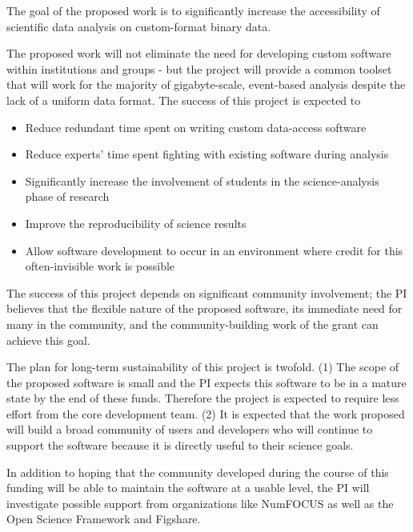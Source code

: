 The goal of the proposed work is to significantly increase the accessibility of scientific data analysis on custom-format binary data.

The proposed work will not eliminate the need for developing custom software within institutions and groups - but the project will provide a common toolset that will work for the majority of gigabyte-scale, event-based analysis despite the lack of a uniform data format.  The success of this project is expected to

\begin{itemize}
    \item Reduce redundant time spent on writing custom data-access software
    \item Reduce experts' time spent fighting with existing software during analysis
    \item Significantly increase the involvement of students in the science-analysis phase of research
    \item Improve the reproducibility of science results 
    \item Allow software development to occur in an environment where credit for this often-invisible work is possible
\end{itemize}

The success of this project depends on significant community involvement; the PI believes that the flexible nature of the proposed software, its immediate need for many in the community, and the community-building work of the grant can achieve this goal.

The plan for long-term sustainability of this project is twofold.  (1) The scope of the proposed software is small and the PI expects this software to be in a mature state by the end of these funds.  Therefore the project is expected to require less effort from the core development team.  (2) It is expected that the work proposed will build a broad community of users and developers who will continue to support the software because it is directly useful to their science goals.

In addition to hoping that the community developed during the course of this funding will be able to maintain the software at a usable level, the PI will investigate possible support from organizations like NumFOCUS as well as the Open Science Framework and Figshare. 